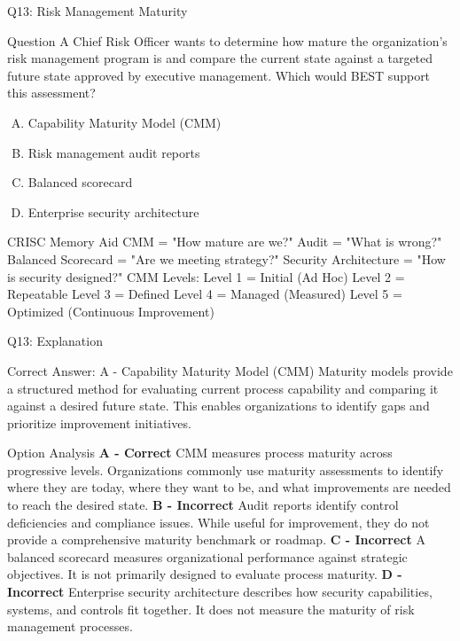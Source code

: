 \documentclass{beamer}
\begin{document}
	
	
	
	
	
	
	
	
	
	\begin{frame}{Q13: Risk Management Maturity} \begin{block}{Question} A Chief Risk Officer wants to determine how mature the organization's risk management program is and compare the current state against a targeted future state approved by executive management. Which would BEST support this assessment? \end{block} \begin{enumerate}[(A)] \item Capability Maturity Model (CMM) \item Risk management audit reports \item Balanced scorecard \item Enterprise security architecture \end{enumerate}  \begin{block}{CRISC Memory Aid} CMM = "How mature are we?" Audit = "What is wrong?" Balanced Scorecard = "Are we meeting strategy?" Security Architecture = "How is security designed?" \vspace{0.15cm} CMM Levels: Level 1 = Initial (Ad Hoc) Level 2 = Repeatable Level 3 = Defined Level 4 = Managed (Measured) Level 5 = Optimized (Continuous Improvement) \end{block} \end{frame} \begin{frame}{Q13: Explanation} \footnotesize \begin{block}{Correct Answer: A - Capability Maturity Model (CMM)} Maturity models provide a structured method for evaluating current process capability and comparing it against a desired future state. This enables organizations to identify gaps and prioritize improvement initiatives. \end{block} \begin{block}{Option Analysis} \textbf{A - Correct} CMM measures process maturity across progressive levels. Organizations commonly use maturity assessments to identify where they are today, where they want to be, and what improvements are needed to reach the desired state. \vspace{0.15cm} \textbf{B - Incorrect} Audit reports identify control deficiencies and compliance issues. While useful for improvement, they do not provide a comprehensive maturity benchmark or roadmap. \vspace{0.15cm} \textbf{C - Incorrect} A balanced scorecard measures organizational performance against strategic objectives. It is not primarily designed to evaluate process maturity. \vspace{0.15cm} \textbf{D - Incorrect} Enterprise security architecture describes how security capabilities, systems, and controls fit together. It does not measure the maturity of risk management processes. \end{block} \end{frame}
	
\end{document}

